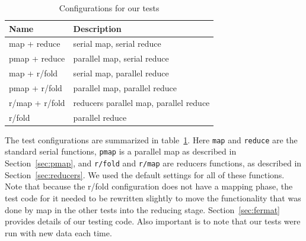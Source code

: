 \documentclass[12pt]{article}
\newcommand{\comment}[1]{{\bf \tt  {#1}}}
\newcommand{\emcomment}[1]{\textcolor{ForestGreen}{\comment{Elena: {#1}}}}
\newcommand{\joecomment}[1]{\textcolor{JoesGold}{\comment{Joe: {#1}}}}
\newcommand{\clocode}[1]{{\texttt {#1}}}
\begin{document}
\begin{table}
\begin{center}
\begin{tabular}{|l|l|}
\hline 
Name & Description \\
\hline
map + reduce & serial map, serial reduce \\
pmap + reduce & parallel map, serial reduce \\
map + r/fold & serial map, parallel reduce \\
pmap + r/fold & parallel map, parallel reduce\\
r/map + r/fold & reducers parallel map, parallel reduce\\
r/fold & parallel reduce\\
\hline
\end{tabular}
\end{center}
\caption{Configurations for our tests}\label{table:tests}
\end{table}

The test configurations are summarized in table~\ref{table:tests}. Here \clocode{map} and \clocode{reduce} are the standard serial functions, \clocode{pmap} is a parallel map as described in Section~\ref{sec:pmap}, and \clocode{r/fold} and \clocode{r/map} are reducers functions, as described in Section~\ref{sec:reducers}. We used the default settings for all of these functions. Note that because the r/fold configuration does not have a mapping phase, the test code for it needed to be rewritten slightly to move the functionality that was done by map in the other tests into the reducing stage. Section~\ref{sec:fermat} provides details of our testing code. Also important is to note that our tests were run with new data each time.



\end{document}
